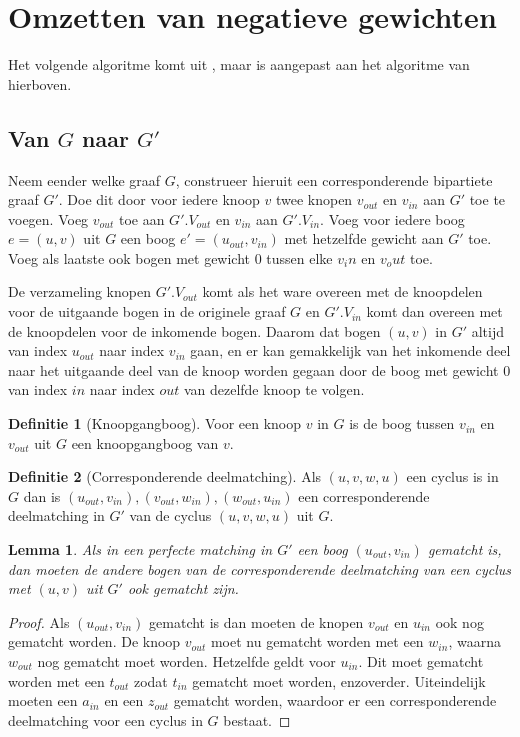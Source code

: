 \documentclass[conference]{IEEEtran}
\newtheorem{lemma}{Lemma}[section]
\theoremstyle{definition}
\newtheorem{definition}{Definitie}[section]
\theoremstyle{remark}
\newcommand{\vin}{_{in}}
\newcommand{\vout}{_{out}}
\begin{document}
\section{Omzetten van negatieve gewichten}
Het volgende algoritme komt uit \cite{Scaling}, maar is aangepast aan het algoritme van hierboven.

\subsection{Van $G$ naar $G'$}
Neem eender welke graaf $G$, construeer hieruit een corresponderende bipartiete graaf $G'$. Doe dit door voor iedere knoop $v$ twee knopen $v_{out}$ en $v_{in}$ aan $G'$ toe te voegen. Voeg $v_{out}$ toe aan $G'.V_{out}$ en $v_{in}$ aan $G'.V_{in}$. Voeg voor iedere boog $e = (u, v)$ uit $G$ een boog $e' = (u_{out}, v_{in})$ met hetzelfde gewicht aan $G'$ toe. Voeg als laatste ook bogen met gewicht $0$ tussen elke $v_in$ en $v_out$ toe.

De verzameling knopen $G'.V_{out}$ komt als het ware overeen met de knoopdelen voor de uitgaande bogen in de originele graaf $G$ en $G'.V_{in}$ komt dan overeen met de knoopdelen voor de inkomende bogen. Daarom dat bogen $(u, v)$ in $G'$ altijd van index $u_{out}$ naar index $v_{in}$ gaan, en er kan gemakkelijk van het inkomende deel naar het uitgaande deel van de knoop worden gegaan door de boog met gewicht $0$ van index $in$ naar index $out$ van dezelfde knoop te volgen.

\begin{definition}[Knoopgangboog]
    Voor een knoop $v$ in $G$ is de boog tussen $v_{in}$ en $v_{out}$ uit $G$ een knoopgangboog van $v$.
\end{definition}

\begin{definition}[Corresponderende deelmatching]
    Als $(u, v, w, u)$ een cyclus is in $G$ dan is ${(u_{out}, v_{in}), (v_{out}, w_{in}), (w_{out}, u_{in})}$ een corresponderende deelmatching in $G'$ van de cyclus $(u, v, w, u)$ uit $G$.
\end{definition}

\begin{lemma}
    Als in een perfecte matching in $G'$ een boog $(u_{out}, v_{in})$ gematcht is, dan moeten de andere bogen van de corresponderende deelmatching van een cyclus met $(u, v)$ uit $G'$ ook gematcht zijn.
\end{lemma}
\begin{proof}
    Als $(u\vout,  v\vin)$ gematcht is dan moeten de knopen $v\vout$ en $u\vin$ ook nog gematcht worden. De knoop $v\vout$ moet nu gematcht worden met een $w\vin$, waarna $w\vout$ nog gematcht moet worden. Hetzelfde geldt voor $u\vin$. Dit moet gematcht worden met een $t\vout$ zodat $t\vin$ gematcht moet worden, enzoverder. Uiteindelijk moeten een $a\vin$ en een $z\vout$ gematcht worden, waardoor er een corresponderende deelmatching voor een cyclus in $G$ bestaat.
\end{proof}
\end{document}
